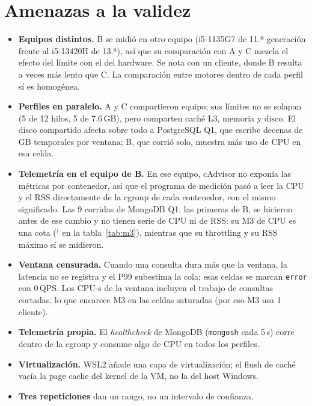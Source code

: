 \documentclass[11pt,letterpaper]{article}
\begin{document}
\section*{Amenazas a la validez}
\label{sec:validez}
\begin{itemize}
  \item \textbf{Equipos distintos.} B se midió en otro equipo (i5-1135G7 de 11.ª generación frente
        al i5-13420H de 13.ª), así que su comparación con A y C mezcla el efecto del límite con el
        del hardware. Se nota con un cliente, donde B resulta a veces más lento que C. La
        comparación entre motores dentro de cada perfil sí es homogénea.
  \item \textbf{Perfiles en paralelo.} A y C compartieron equipo; sus límites no se solapan
        (5 de 12 hilos, 5 de 7.6\,GB), pero comparten caché L3, memoria y disco. El disco
        compartido afecta sobre todo a PostgreSQL Q1, que escribe decenas de GB temporales por
        ventana; B, que corrió solo, muestra más uso de CPU en esa celda.
  \item \textbf{Telemetría en el equipo de B.} En ese equipo, cAdvisor no exponía las
        métricas por contenedor, así que el programa de medición pasó a leer la CPU y el RSS
        directamente de la cgroup de cada contenedor, con el mismo significado. Las 9 corridas
        de MongoDB Q1, las primeras de B, se hicieron antes de ese cambio y no tienen serie de
        CPU ni de RSS: su M3 de CPU es una cota ($^\dagger$ en la tabla~\ref{tab:m3}), mientras
        que su throttling y su RSS máximo sí se midieron.
  \item \textbf{Ventana censurada.} Cuando una consulta dura más que la ventana, la latencia no se
        registra y el P99 subestima la cola; esas celdas se marcan \texttt{error} con 0\,QPS. Los
        CPU-s de la ventana incluyen el trabajo de consultas cortadas, lo que encarece M3 en las
        celdas saturadas (por eso M3 usa 1 cliente).
  \item \textbf{Telemetría propia.} El \emph{healthcheck} de MongoDB (\texttt{mongosh} cada 5\,s)
        corre dentro de la cgroup y consume algo de CPU en todos los perfiles.
  \item \textbf{Virtualización.} WSL2 añade una capa de virtualización; el flush de caché vacía la
        page cache del kernel de la VM, no la del host Windows.
  \item \textbf{Tres repeticiones} dan un rango, no un intervalo de confianza.
\end{itemize}
\end{document}

